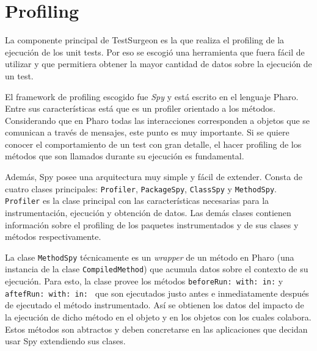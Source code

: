

\section{Profiling}
 
\par La componente principal de TestSurgeon es la que realiza el profiling  de la ejecución de los unit tests. Por eso se escogió una herramienta que fuera fácil de utilizar y que permitiera obtener la mayor cantidad de datos sobre la ejecución de un test.
\par El framework de profiling escogido fue \emph{Spy} y está escrito en el lenguaje Pharo. Entre sus características está que es un profiler orientado a los métodos. Considerando que en Pharo todas las interacciones corresponden a objetos que se comunican a través de mensajes, este punto es muy importante. Si se quiere conocer el comportamiento de un test con gran detalle, el hacer profiling de los métodos que son llamados durante su ejecución es fundamental. 

\par Además, Spy posee una arquitectura muy simple y fácil de extender. Consta de cuatro clases principales: {\tt Profiler}, {\tt PackageSpy}, {\tt ClassSpy} y {\tt MethodSpy}. {\tt Profiler} es la clase principal con las características necesarias para la instrumentación, ejecución y obtención de datos. Las demás clases contienen información sobre el profiling de los paquetes instrumentados y de sus clases y métodos respectivamente. 

\par La clase {\tt MethodSpy} técnicamente es un \emph{wrapper} de un método en Pharo (una instancia de la clase {\tt CompiledMethod}) que acumula datos sobre el contexto de su ejecución. Para esto, la clase provee los métodos {\tt beforeRun: with: in:} y {\tt aftefRun: with: in: } que son ejecutados justo antes e inmediatamente después de ejecutado el método instrumentado. Así se obtienen los datos del impacto de la ejecución de dicho método en el objeto y en los objetos con los cuales colabora. Estos métodos son abtractos y deben concretarse en las aplicaciones que decidan usar Spy extendiendo sus clases. 



